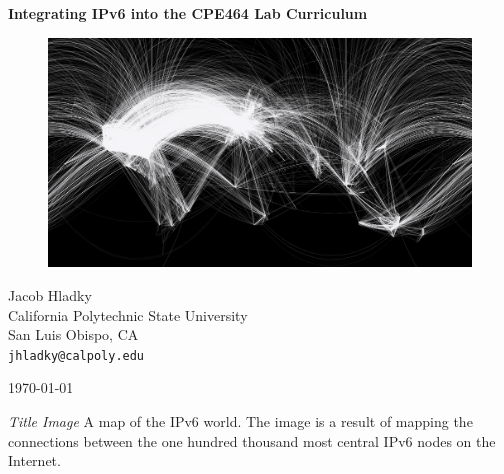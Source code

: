 \documentclass[12pt]{article}
\begin{document}
\begin{titlepage}
  \begin{center}
    \vspace*{1cm}
    \huge\textbf{{Integrating IPv6 into the CPE464 Lab Curriculum}}

    \vspace{1.5cm}

    \begin{figure}[ht!]
      \includegraphics[width=1\textwidth]{internet_map.png}
      \label{fig:internet_map}
    \end{figure}

    \vfill
    \large{
      Jacob Hladky\\
      California Polytechnic State University\\
      San Luis Obispo, CA\\
      \texttt{jhladky@calpoly.edu}
    }

    \vspace{1cm}

    \today   
  \end{center}
\end{titlepage}


\tableofcontents

\listoffigures
\bigskip
\textit{Title Image} \hspace{0.25in} A map of the IPv6 world. The image is a result of mapping the connections between the one hundred thousand most central IPv6 nodes on the Internet.

\listoftables
\clearpage

\end{document}
